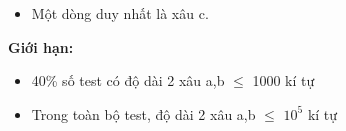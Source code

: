 \begin{itemize}
	\item     Một dòng duy nhất là xâu c.   
\end{itemize}

\textbf{     Giới hạn:    }
\begin{itemize}
	\item     40\% số test có độ dài 2 xâu a,b  $\le$  1000 kí tự   
	\item     Trong toàn bộ test, độ dài 2 xâu a,b  $\le$  $10^{5}$    kí tự   
\end{itemize}
